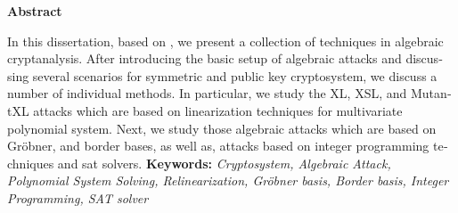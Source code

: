 \thispagestyle{empty} %
\begin{latin} %
\vskip 1cm
\centerline{\textbf{\large{Abstract}}}
\vskip 1cm
\noindent
In this dissertation, based on 
\cite{kreuzer2009algebraic}
, we present a collection of techniques in algebraic cryptanalysis. After introducing  the basic setup of algebraic attacks and discussing several scenarios for symmetric and public key cryptosystem, we discuss a number of individual methods. In particular, we study the XL, XSL, and MutantXL attacks which are based on linearization techniques for multivariate polynomial system. Next, we study those algebraic attacks which are based on Gr\"{o}bner, and border bases, as well as, attacks based on integer programming techniques and sat solvers.
\vskip 2cm
\textbf{Keywords:}
\textit{ Cryptosystem, Algebraic Attack, Polynomial System Solving, Relinearization, Gr\"{o}bner basis, Border basis, Integer Programming, SAT solver}
\end{latin}